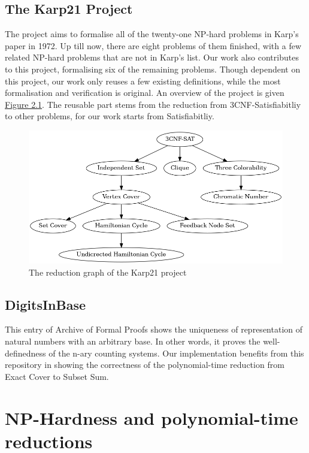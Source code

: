 \subsection*{The Karp21 Project}
The project aims to formalise all of the twenty-one NP-hard problems in Karp's paper in 1972\parencite{karp2010reducibility}. 
Up till now, there are eight problems of them finished, with a few related NP-hard problems that are not in Karp's list. 
Our work also contributes to this project, formalising six of the remaining problems. 
Though dependent on this project, our work only reuses a few existing definitions, 
while the most formalisation and verification is original. An overview of the project is given \hyperref[figure:1]{Figure 2.1}.
The reusable part stems from the reduction from 3CNF-Satisfiabitliy to other problems, for our work starts from Satisfiabitliy.
\begin{figure}[h!]
\centering
\includegraphics[scale=0.4]{figures/reductions.png}
\caption{The reduction graph of the Karp21 project}
\label{figure:1}
\end{figure}

\subsection*{DigitsInBase}
This entry of Archive of Formal Proofs shows the uniqueness of representation of natural numbers with an arbitrary base. 
In other words, it proves the well-definedness of the n-ary counting systems. 
Our implementation benefits from this repository in showing the correctness of the polynomial-time reduction from Exact Cover to Subset Sum.

\section{NP-Hardness and polynomial-time reductions}
